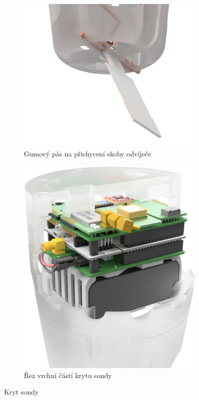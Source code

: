 \documentclass[twoside]{ctuthesis}
\theoremstyle{plain}
\theoremstyle{definition}
\theoremstyle{note}
\begin{document}
	\begin{figure}[hbtp]
		\centering
		\begin{subfigure}{.49\textwidth}
			\centering
			\includegraphics[height=.7\textwidth]{Figures/sonda_guma.png}
			\caption{Gumový pás na přichycení skoby odvíječe}
			\label{fig:sonda:guma}
		\end{subfigure}%
		\begin{subfigure}{.49\textwidth}
			\centering
			\includegraphics[height=.7\linewidth]{Figures/ALL_rez_white.png}
			\caption{Řez vrchní částí krytu sondy}
			\label{fig:all:rez}
		\end{subfigure}
		\caption{Kryt sondy}
		\label{fig:shields}
	\end{figure}

	
	
\end{document}
